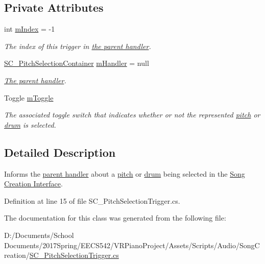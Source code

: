 \subsection*{Private Attributes}
\begin{DoxyCompactItemize}
\item 
int \hyperlink{group___s_c___p_s_t_priv_var_ga7d7771170c1f6cb1d6a9eb41e96a478f}{m\+Index} = -\/1
\begin{DoxyCompactList}\small\item\em The index of this trigger in \hyperlink{group___doc_s_c___p_s_c}{the parent handler}. \end{DoxyCompactList}\item 
\hyperlink{class_s_c___pitch_selection_container}{S\+C\+\_\+\+Pitch\+Selection\+Container} \hyperlink{group___s_c___p_s_t_priv_var_ga23cf7134e224e9718a99949979cd5078}{m\+Handler} = null
\begin{DoxyCompactList}\small\item\em \hyperlink{group___doc_s_c___p_s_c}{The parent handler}. \end{DoxyCompactList}\item 
Toggle \hyperlink{group___s_c___p_s_t_priv_var_ga1ecd33f50c82f6ffda81850438907a31}{m\+Toggle}
\begin{DoxyCompactList}\small\item\em The associated toggle switch that indicates whether or not the represented \hyperlink{group___music_enums_ga508f69b199ea518f935486c990edac1d}{pitch} or \hyperlink{group___music_enums_gade475b4382c7066d1af13e7c13c029b6}{drum} is selected. \end{DoxyCompactList}\end{DoxyCompactItemize}


\subsection{Detailed Description}
Informs the \hyperlink{group___doc_s_c___p_s_c}{parent handler} about a \hyperlink{group___music_enums_ga508f69b199ea518f935486c990edac1d}{pitch} or \hyperlink{group___music_enums_gade475b4382c7066d1af13e7c13c029b6}{drum} being selected in the \hyperlink{group___doc_s_c}{Song Creation Interface}. 

Definition at line 15 of file S\+C\+\_\+\+Pitch\+Selection\+Trigger.\+cs.



The documentation for this class was generated from the following file\+:\begin{DoxyCompactItemize}
\item 
D\+:/\+Documents/\+School Documents/2017\+Spring/\+E\+E\+C\+S542/\+V\+R\+Piano\+Project/\+Assets/\+Scripts/\+Audio/\+Song\+Creation/\hyperlink{_s_c___pitch_selection_trigger_8cs}{S\+C\+\_\+\+Pitch\+Selection\+Trigger.\+cs}\end{DoxyCompactItemize}
